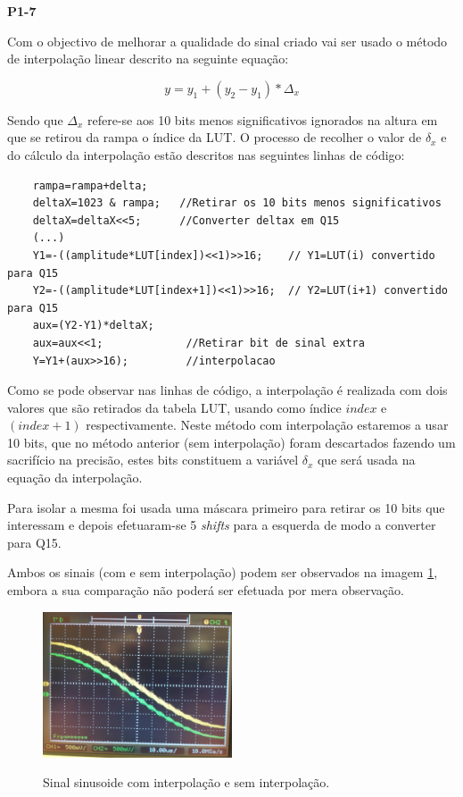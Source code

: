 \documentclass[11pt]{article}
\begin{document}
\textbf{P1-7}
\label{para:P1-7}

Com o objectivo de melhorar a qualidade do sinal criado vai ser usado o método de interpolação linear descrito na seguinte equação:

\begin{equation}
y=y_{1}+(y_{2}-y_{1})*\Delta_{x}
\end{equation}

Sendo que $ \Delta_{x} $ refere-se aos 10 bits menos significativos ignorados na altura em que se retirou da rampa o índice da LUT. O processo de recolher o valor de $ \delta_{x} $ e do cálculo da interpolação estão descritos nas seguintes linhas de código:

\begin{lstlisting}
	rampa=rampa+delta;
	deltaX=1023 & rampa;   //Retirar os 10 bits menos significativos
	deltaX=deltaX<<5;      //Converter deltax em Q15
	(...)
	Y1=-((amplitude*LUT[index])<<1)>>16;	// Y1=LUT(i) convertido para Q15
	Y2=-((amplitude*LUT[index+1])<<1)>>16;	// Y2=LUT(i+1) convertido para Q15
	aux=(Y2-Y1)*deltaX;		
	aux=aux<<1;				//Retirar bit de sinal extra
	Y=Y1+(aux>>16);			//interpolacao	
\end{lstlisting}

Como se pode observar nas linhas de código, a interpolação é realizada com dois valores que são retirados da tabela LUT, usando como índice $\textit{index}$ \hspace{0,1 mm} e $(\textit{index}+1)$ respectivamente. Neste método com interpolação estaremos a usar 10 bits, que no método anterior (sem interpolação) foram descartados fazendo um sacrifício na precisão,  estes bits constituem a variável $ \delta_{x} $ que será usada na equação da interpolação.

Para isolar a mesma foi usada uma máscara primeiro para retirar os 10 bits que interessam e depois efetuaram-se 5 \textit{shifts} para a esquerda de modo a converter para Q15.

Ambos os sinais (com e sem interpolação) podem ser observados na imagem \ref{fig:interp}, embora a sua comparação não poderá ser efetuada por mera observação.

\begin{figure}[H]
	\centering
	\label{fig:interp}
	\includegraphics[width=0.5\textwidth]{./P1_interp}~\\
	\caption{Sinal sinusoide com interpolação e sem interpolação.}
\end{figure}
\end{document}
